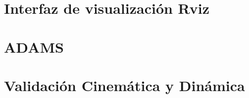         \newpage
    
    

    \newpage

\section{Interfaz de visualización Rviz}
\section{ADAMS}
\section{Validación Cinemática y Dinámica}